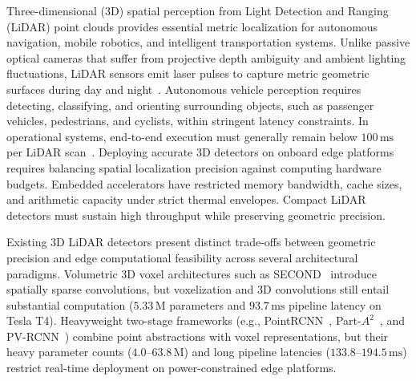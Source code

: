 
Three-dimensional (3D) spatial perception from Light Detection and Ranging (LiDAR) point clouds provides essential metric localization for autonomous navigation, mobile robotics, and intelligent transportation systems. Unlike passive optical cameras that suffer from projective depth ambiguity and ambient lighting fluctuations, LiDAR sensors emit laser pulses to capture metric geometric surfaces during day and night~\cite{geiger2012kitti}. Autonomous vehicle perception requires detecting, classifying, and orienting surrounding objects, such as passenger vehicles, pedestrians, and cyclists, within stringent latency constraints. In operational systems, end-to-end execution must generally remain below $100\,\text{ms}$ per LiDAR scan~\cite{yang2018pixor}. Deploying accurate 3D detectors on onboard edge platforms requires balancing spatial localization precision against computing hardware budgets. Embedded accelerators have restricted memory bandwidth, cache sizes, and arithmetic capacity under strict thermal envelopes. Compact LiDAR detectors must sustain high throughput while preserving geometric precision.

Existing 3D LiDAR detectors present distinct trade-offs between geometric precision and edge computational feasibility across several architectural paradigms. Volumetric 3D voxel architectures such as SECOND~\cite{yan2018second} introduce spatially sparse convolutions, but voxelization and 3D convolutions still entail substantial computation ($5.33\,\text{M}$ parameters and $93.7\,\text{ms}$ pipeline latency on Tesla T4). Heavyweight two-stage frameworks (e.g., PointRCNN~\cite{shi2019pointrcnn}, Part-$A^2$~\cite{shi2020part}, and PV-RCNN~\cite{shi2020pvrcnn}) combine point abstractions with voxel representations, but their heavy parameter counts ($4.0\text{--}63.8\,\text{M}$) and long pipeline latencies ($133.8\text{--}194.5\,\text{ms}$) restrict real-time deployment on power-constrained edge platforms.

